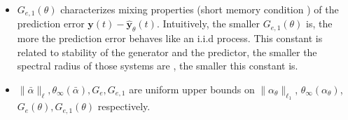 \documentclass{article}
\def\rvw{{\mathbf{w}}}
\def\rvy{{\mathbf{y}}}
\newcommand{\y}{\mathbf{y}}
\begin{document}
\begin{itemize}
\item \textbf{$G_{e,1}(\theta)$} characterizes
mixing properties (short memory condition \cite{alquier2013prediction})  of the prediction
error $\y(t)-\hat{\y}_\theta(t)$. Intuitively, the smaller $G_{e,1}(\theta)$ is, the more the prediction error behaves like an i.i.d process. 
This constant is related to stability of the generator and the predictor,
the smaller the spectral radius of those systems are , the
smaller this constant is.  

\item \textbf{$\|\bar{\alpha}\|_{\ell},\theta_{\infty}(\bar{\alpha}),G_{e},G_{e,1}$} are uniform upper bounds on 
$\|\alpha_{\theta}\|_{\ell_1}$, $\theta_{\infty}(\alpha_{\theta})$,
$G_e(\theta),G_{e,1}(\theta)$ respectively. 
\end{itemize}
\end{document}
